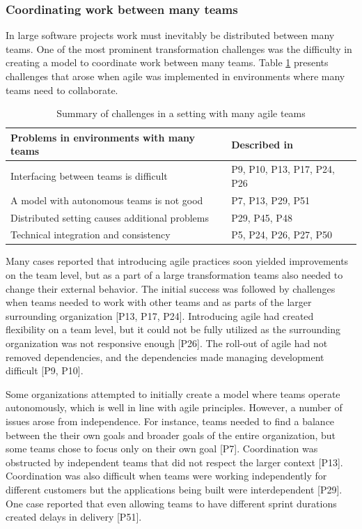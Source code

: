 \documentclass[preprint,authoryear,12pt]{elsarticle}
\begin{document}
\subsubsection{Coordinating work between many teams}

In large software projects work must inevitably be distributed between many
teams. One of the most prominent transformation challenges was the difficulty in
creating a model to coordinate work between many teams. Table
\ref{table:challenges_coordinatingteams} presents challenges that arose when
agile was implemented in environments where many teams need to collaborate.

\begin{table}[h]
    \centering
    \begin{tabular}{ >{\raggedright\arraybackslash}p{}
                     >{\raggedright\arraybackslash}p{} }
        \toprule
        Problems in environments with many teams  &  Described in \\
        \midrule
        Interfacing between teams is difficult     &  P9, P10, P13, P17, P24, P26 \\
        A model with autonomous teams is not good  &  P7, P13, P29, P51  \\
        Distributed setting causes additional problems  &  P29, P45, P48  \\
        Technical integration and consistency      &  P5, P24, P26, P27, P50  \\
        \bottomrule
    \end{tabular}
    \caption{Summary of challenges in a setting with many agile teams}
    \label{table:challenges_coordinatingteams}
\end{table}

Many cases reported that introducing agile practices soon yielded improvements
on the team level, but as a part of a large transformation teams also needed to
change their external behavior.
The initial success was followed by challenges when teams needed to work with
other teams and as parts of the larger surrounding organization [P13, P17, P24].
Introducing agile had created flexibility on a team level, but it could not be
fully utilized as the surrounding organization was not responsive enough [P26].
The roll-out of agile had not removed dependencies, and the dependencies
made managing development difficult [P9, P10].


Some organizations attempted to initially create a model where teams operate
autonomously, which is well in line with agile principles. However, a number of
issues arose from independence. For instance, teams needed to find a balance
between the their own goals and broader goals of the entire organization, but
some teams chose to focus only on their own goal [P7]. Coordination was
obstructed by independent teams that did not respect the larger context [P13].
Coordination was also difficult when teams were working independently for
different customers but the applications being built were interdependent [P29].
One case reported that even allowing teams to have different sprint durations
created delays in delivery [P51].
\end{document}
